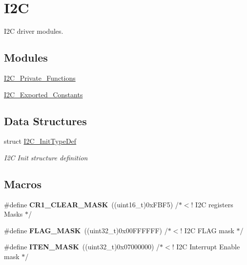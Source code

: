 \hypertarget{group___i2_c}{}\section{I2C}
\label{group___i2_c}


I2C driver modules.  


\subsection*{Modules}
\begin{DoxyCompactItemize}
\item 
\mbox{\hyperlink{group___i2_c___private___functions}{I2\+C\+\_\+\+Private\+\_\+\+Functions}}
\item 
\mbox{\hyperlink{group___i2_c___exported___constants}{I2\+C\+\_\+\+Exported\+\_\+\+Constants}}
\end{DoxyCompactItemize}
\subsection*{Data Structures}
\begin{DoxyCompactItemize}
\item 
struct \mbox{\hyperlink{struct_i2_c___init_type_def}{I2\+C\+\_\+\+Init\+Type\+Def}}
\begin{DoxyCompactList}\small\item\em I2C Init structure definition ~\newline
 \end{DoxyCompactList}\end{DoxyCompactItemize}
\subsection*{Macros}
\begin{DoxyCompactItemize}
\item 
\mbox{\label{group___i2_c_ga8d425258898b4af4ebc820f52635fad8}} 
\#define {\bfseries C\+R1\+\_\+\+C\+L\+E\+A\+R\+\_\+\+M\+A\+SK}~((uint16\+\_\+t)0x\+F\+B\+F5)      /$\ast$$<$! I2\+C registers Masks $\ast$/
\item 
\mbox{\label{group___i2_c_ga890221cb651a3f30f6d1bca0d9b0e13d}} 
\#define {\bfseries F\+L\+A\+G\+\_\+\+M\+A\+SK}~((uint32\+\_\+t)0x00\+F\+F\+F\+F\+F\+F)  /$\ast$$<$! I2\+C F\+L\+A\+G mask $\ast$/
\item 
\mbox{\label{group___i2_c_ga0befa8c9e0cb00ab52bd8a8d68718706}} 
\#define {\bfseries I\+T\+E\+N\+\_\+\+M\+A\+SK}~((uint32\+\_\+t)0x07000000)  /$\ast$$<$! I2\+C Interrupt Enable mask $\ast$/
\end{DoxyCompactItemize}
